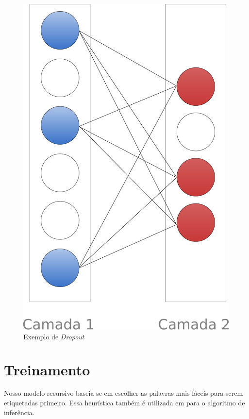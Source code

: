 \begin{figure}[!htb]
    \caption{Exemplo de \textit{Dropout}}\label{fig:dropout}
    \begin{center}
        \includegraphics[scale=0.12]{img/dropout.pdf}
    \end{center}
\end{figure}



\section{Treinamento}

Nosso modelo recursivo baseia-se em escolher as palavras mais fáceis para serem etiquetadas primeiro. Essa heurística também é utilizada em \cite{shen2007guided} para o algoritmo de inferência. 

